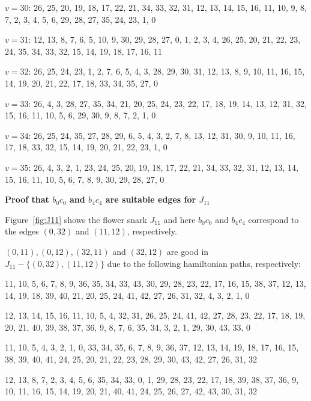 \documentclass{amcjoucc}
\begin{document}
\begin{itemize}
{\item $v = 30$: 26, 25, 20, 19, 18, 17, 22, 21, 34, 33, 32, 31, 12, 13, 14, 15, 16, 11, 10, 9, 8, 7, 2, 3, 4, 5, 6, 29, 28, 27, 35, 24, 23, 1, 0
\item $v = 31$: 12, 13, 8, 7, 6, 5, 10, 9, 30, 29, 28, 27, 0, 1, 2, 3, 4, 26, 25, 20, 21, 22, 23, 24, 35, 34, 33, 32, 15, 14, 19, 18, 17, 16, 11
\item $v = 32$: 26, 25, 24, 23, 1, 2, 7, 6, 5, 4, 3, 28, 29, 30, 31, 12, 13, 8, 9, 10, 11, 16, 15, 14, 19, 20, 21, 22, 17, 18, 33, 34, 35, 27, 0
\item $v = 33$: 26, 4, 3, 28, 27, 35, 34, 21, 20, 25, 24, 23, 22, 17, 18, 19, 14, 13, 12, 31, 32, 15, 16, 11, 10, 5, 6, 29, 30, 9, 8, 7, 2, 1, 0
\item $v = 34$: 26, 25, 24, 35, 27, 28, 29, 6, 5, 4, 3, 2, 7, 8, 13, 12, 31, 30, 9, 10, 11, 16, 17, 18, 33, 32, 15, 14, 19, 20, 21, 22, 23, 1, 0
\item $v = 35$: 26, 4, 3, 2, 1, 23, 24, 25, 20, 19, 18, 17, 22, 21, 34, 33, 32, 31, 12, 13, 14, 15, 16, 11, 10, 5, 6, 7, 8, 9, 30, 29, 28, 27, 0}
\end{itemize}




\noindent
\textbf{Proof that $b_0c_0$ and $b_4c_4$ are suitable edges for $J_{11}$}

Figure~\ref{fig:J11} shows the flower snark $J_{11}$ and here $b_0c_0$ and $b_4c_4$ correspond to the edges $(0,32)$ and $(11, 12)$, respectively.


$(0,11), (0,12), (32,11)$ and $(32,12)$ are good in $J_{11} - \{(0,32),(11,12)\}$ due to the following hamiltonian paths, respectively:


\begin{itemize}
{\small
\item 11, 10, 5, 6, 7, 8, 9, 36, 35, 34, 33, 43, 30, 29, 28, 23, 22, 17, 16, 15, 38, 37, 12, 13, 14, 19, 18, 39, 40, 21, 20, 25, 24, 41, 42, 27, 26, 31, 32, 4, 3, 2, 1, 0
\item 12, 13, 14, 15, 16, 11, 10, 5, 4, 32, 31, 26, 25, 24, 41, 42, 27, 28, 23, 22, 17, 18, 19, 20, 21, 40, 39, 38, 37, 36, 9, 8, 7, 6, 35, 34, 3, 2, 1, 29, 30, 43, 33, 0
\item 11, 10, 5, 4, 3, 2, 1, 0, 33, 34, 35, 6, 7, 8, 9, 36, 37, 12, 13, 14, 19, 18, 17, 16, 15, 38, 39, 40, 41, 24, 25, 20, 21, 22, 23, 28, 29, 30, 43, 42, 27, 26, 31, 32
\item 12, 13, 8, 7, 2, 3, 4, 5, 6, 35, 34, 33, 0, 1, 29, 28, 23, 22, 17, 18, 39, 38, 37, 36, 9, 10, 11, 16, 15, 14, 19, 20, 21, 40, 41, 24, 25, 26, 27, 42, 43, 30, 31, 32}
\end{itemize}
\end{document}
